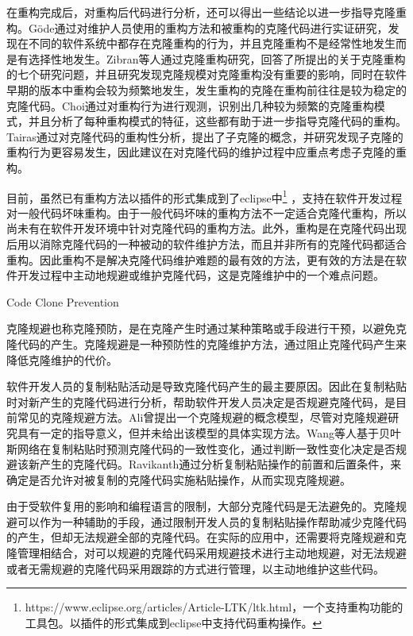 在重构完成后，对重构后代码进行分析，还可以得出一些结论以进一步指导克隆重构。G{\"o}de通过对维护人员使用的重构方法和被重构的克隆代码进行实证研究，发现在不同的软件系统中都存在克隆重构的行为，并且克隆重构不是经常性地发生而是有选择性地发生\cite{gode2010clone}。Zibran等人通过克隆重构研究，回答了所提出的关于克隆重构的七个研究问题，并且研究发现克隆规模对克隆重构没有重要的影响，同时在软件早期的版本中重构会较为频繁地发生，发生重构的克隆在重构前往往是较为稳定的克隆代码\cite{zibran2013evaluating}。Choi通过对重构行为进行观测，识别出几种较为频繁的克隆重构模式，并且分析了每种重构模式的特征，这些都有助于进一步指导克隆代码的重构\cite{eunjong2014investigation}。Tairas通过对克隆代码的重构性分析，提出了子克隆的概念，并研究发现子克隆的重构行为更容易发生，因此建议在对克隆代码的维护过程中应重点考虑子克隆的重构\cite{tairas2010sub}。

目前，虽然已有重构方法以插件的形式集成到了eclipse中\footnote{https://www.eclipse.org/articles/Article-LTK/ltk.html，一个支持重构功能的工具包。以插件的形式集成到eclipse中支持代码重构操作。} ，支持在软件开发过程对一般代码坏味重构。由于一般代码坏味的重构方法不一定适合克隆代重构，所以尚未有在软件开发环境中针对克隆代码的重构方法。此外，重构是在克隆代码出现后用以消除克隆代码的一种被动的软件维护方法，而且并非所有的克隆代码都适合重构。因此重构不是解决克隆代码维护难题的最有效的方法，更有效的方法是在软件开发过程中主动地规避或维护克隆代码，这是克隆维护中的一个难点问题。

{Code Clone Prevention}

克隆规避也称克隆预防，是在克隆产生时通过某种策略或手段进行干预，以避免克隆代码的产生。克隆规避是一种预防性的克隆维护方法，通过阻止克隆代码产生来降低克隆维护的代价。

软件开发人员的复制粘贴活动是导致克隆代码产生的最主要原因。因此在复制粘贴时对新产生的克隆代码进行分析，帮助软件开发人员决定是否规避克隆代码，是目前常见的克隆规避方法。Ali曾提出一个克隆规避的概念模型\cite{ali2013enhancing}，尽管对克隆规避研究具有一定的指导意义，但并未给出该模型的具体实现方法。Wang等人基于贝叶斯网络在复制粘贴时预测克隆代码的一致性变化，通过判断一致性变化决定是否规避该新产生的克隆代码\cite{wang2012can}\cite{wang2014predicting}。Ravikanth通过分析复制粘贴操作的前置和后置条件，来确定是否允许对被复制的克隆代码实施粘贴操作，从而实现克隆规避\cite{venkatasubramanyam2012method}。

由于受软件复用的影响和编程语言的限制，大部分克隆代码是无法避免的。克隆规避可以作为一种辅助的手段，通过限制开发人员的复制粘贴操作帮助减少克隆代码的产生，但却无法规避全部的克隆代码。在实际的应用中，还需要将克隆规避和克隆管理相结合，对可以规避的克隆代码采用规避技术进行主动地规避，对无法规避或者无需规避的克隆代码采用跟踪的方式进行管理，以主动地维护这些代码。


